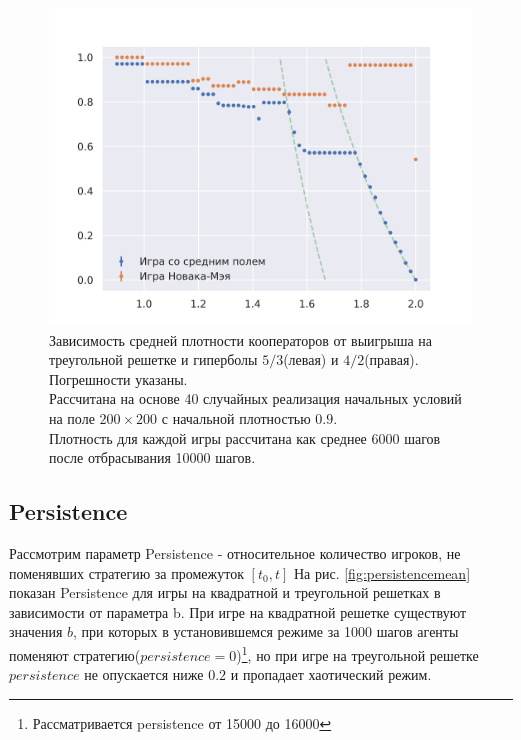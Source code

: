 \documentclass[12pt]{article}
\begin{document}
        \begin{figure}[!h]
            \centering
            \captionsetup{justification=centering}
            \includegraphics[scale=0.8]{TriangularMeanFieldGame/density_NovakMay_Mean_triangular_game.png}
            \caption{Зависимость средней плотности кооператоров от выигрыша на треугольной решетке и гиперболы $5/3$(левая) и $4/2$(правая). Погрешности указаны.\\
            Рассчитана на основе 40 случайных реализация начальных условий на поле $200\times200$ с начальной плотностью $0.9$.\\
            Плотность для каждой игры рассчитана как среднее 6000 шагов после отбрасывания 10000 шагов. 
            }
            \label{fig:payoffvsdensityTr}
        \end{figure}
        
        
    \subsection{Persistence}
        Рассмотрим параметр Persistence - относительное количество игроков, не поменявших стратегию за промежуток $[t_0, t]$
        На рис. \ref{fig:persistencemean} показан Persistence для игры на квадратной и треугольной решетках в зависимости от параметра b. При игре на квадратной решетке существуют значения $b$, при которых в установившемся режиме за 1000 шагов агенты поменяют стратегию($persistence=0$)\footnote{Рассматривается persistence от 15000 до 16000}, но при игре на треугольной решетке $persistence$ не опускается ниже $0.2$ и пропадает хаотический режим.
        
\end{document}
